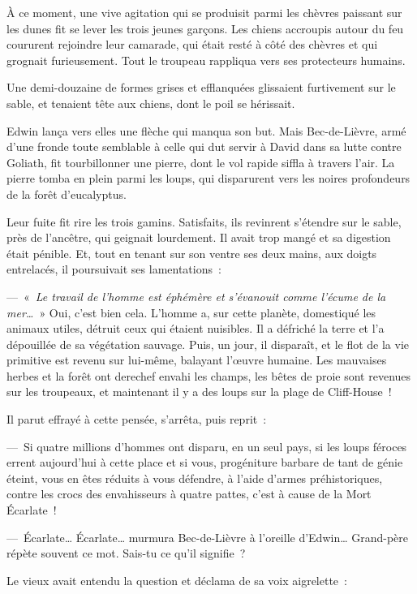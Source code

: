 \documentclass[french,twoside]{book} %
\begin{document}
À ce moment, une vive agitation qui se produisit parmi les chèvres paissant sur les dunes fit se lever les trois jeunes garçons. Les chiens accroupis autour du feu coururent rejoindre leur camarade, qui était resté à côté des chèvres et qui grognait furieusement. Tout le troupeau rappliqua vers ses protecteurs humains.\par
Une demi-douzaine de formes grises et efflanquées glissaient furtivement sur le sable, et tenaient tête aux chiens, dont le poil se hérissait.\par
Edwin lança vers elles une flèche qui manqua son but. Mais Bec-de-Lièvre, armé d’une fronde toute semblable à celle qui dut servir à David dans sa lutte contre Goliath, fit tourbillonner une pierre, dont le vol rapide siffla à travers l’air. La pierre tomba en plein parmi les loups, qui disparurent vers les noires profondeurs de la forêt d’eucalyptus.\par
Leur fuite fit rire les trois gamins. Satisfaits, ils revinrent s’étendre sur le sable, près de l’ancêtre, qui geignait lourdement. Il avait trop mangé et sa digestion était pénible. Et, tout en tenant sur son ventre ses deux mains, aux doigts entrelacés, il poursuivait ses lamentations :\par
— « \emph{Le travail de l’homme est éphémère et s’évanouit comme l’écume de la mer…} » Oui, c’est bien cela. L’homme a, sur cette planète, domestiqué les animaux utiles, détruit ceux qui étaient nuisibles. Il a défriché la terre et l’a dépouillée de sa végétation sauvage. Puis, un jour, il disparaît, et le flot de la vie primitive est revenu sur lui-même, balayant l’œuvre humaine. Les mauvaises herbes et la forêt ont derechef envahi les champs, les bêtes de proie sont revenues sur les troupeaux, et maintenant il y a des loups sur la plage de Cliff-House !\par
Il parut effrayé à cette pensée, s’arrêta, puis reprit :\par
— Si quatre millions d’hommes ont disparu, en un seul pays, si les loups féroces errent aujourd’hui à cette place et si vous, progéniture barbare de tant de génie éteint, vous en êtes réduits à vous défendre, à l’aide d’armes préhistoriques, contre les crocs des envahisseurs à quatre pattes, c’est à cause de la Mort Écarlate !\par
— Écarlate… Écarlate… murmura Bec-de-Lièvre à l’oreille d’Edwin… Grand-père répète souvent ce mot. Sais-tu ce qu’il signifie ?\par
Le vieux avait entendu la question et déclama de sa voix aigrelette :\par
\end{document}
